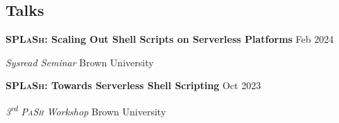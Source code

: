 \documentclass[margin,12pt]{resume}
\newcommand{\descriptionVSpace}{\vspace{0.5ex}\xspace}
\newcommand{\subsectionVSpace}{\vspace{3.5ex}\xspace}
\newcommand{\sectionVSpace}{\vspace{1ex}\xspace} %
\newcommand{\pash}{\textsc{PaSh}\xspace}
\newcommand{\sectionVSpaceCorrection}{\vspace{-3.5ex}} %
\newcommand{\splash}{\textsc{SPLaSh}\xspace}
\newcommand{\header}[1]{\textbf{#1}\xspace}
\newcommand{\competition}[1]{\header{#1}\xspace}
\newcommand{\event}[1]{\textit{#1}\xspace}
\newcommand{\interval}[2]{#1 --- #2\xspace}
\newcommand{\ordinal}[1]{\textsuperscript{#1}\xspace}
\newcommand{\place}[1]{#1\xspace}
\newcommand{\singleDate}[1]{#1\xspace}
\newcommand{\talk}[1]{\header{#1}\xspace}
\newenvironment{rSubsection}{}{\par\subsectionVSpace}
\newenvironment{rSection}[1]{\sectionVSpaceCorrection\section{#1}\xspace}{\sectionVSpace\par}
\newenvironment{jobDuties}{\descriptionVSpace}{\par}
\begin{document}
\begin{resume}
    \begin{rSection}{Talks}


        \begin{rSubsection}
            \talk{\splash: Scaling Out Shell Scripts on Serverless Platforms} \hfill \singleDate{Feb 2024}

            \event{Sysread Seminar} \hfill \place{Brown University}
        \end{rSubsection}



        \begin{rSubsection}
            \talk{\splash: Towards Serverless Shell Scripting} \hfill \singleDate{Oct 2023}

            \event{3\ordinal{rd} \pash Workshop} \hfill \place{Brown University}
        \end{rSubsection}
    \end{rSection}






\end{resume}
\end{document}
